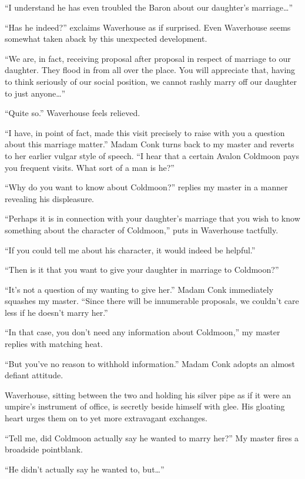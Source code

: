 \documentclass{book}
\begin{document}
``I understand he has even troubled the Baron about our daughter's
marriage\ldots{}''

``Has he indeed?'' exclaims Waverhouse as if surprised. Even Waverhouse
seems somewhat taken aback by this unexpected development.

``We are, in fact, receiving proposal after proposal in respect of
marriage to our daughter. They flood in from all over the place. You
will appreciate that, having to think seriously of our social position,
we cannot rashly marry off our daughter to just anyone\ldots{}''

``Quite so.'' Waverhouse feels relieved.

``I have, in point of fact, made this visit precisely to raise with you
a question about this marriage matter.'' Madam Conk turns back to my
master and reverts to her earlier vulgar style of speech. ``I hear that
a certain Avalon Coldmoon pays you frequent visits. What sort of a man
is he?''

``Why do you want to know about Coldmoon?'' replies my master in a
manner revealing his displeasure.

``Perhaps it is in connection with your daughter's marriage that you
wish to know something about the character of Coldmoon,'' puts in
Waverhouse tactfully.

``If you could tell me about his character, it would indeed be
helpful.''

``Then is it that you want to give your daughter in marriage to
Coldmoon?''

``It's not a question of my wanting to give her.'' Madam Conk
immediately squashes my master. ``Since there will be innumerable
proposals, we couldn't care less if he doesn't marry her.''

``In that case, you don't need any information about Coldmoon,'' my
master replies with matching heat.

``But you've no reason to withhold information.'' Madam Conk adopts an
almost defiant attitude.

Waverhouse, sitting between the two and holding his silver pipe as if it
were an umpire's instrument of office, is secretly beside himself with
glee. His gloating heart urges them on to yet more extravagant
exchanges.

``Tell me, did Coldmoon actually say he wanted to marry her?'' My master
fires a broadside pointblank.

``He didn't actually say he wanted to, but\ldots{}''
\end{document}
